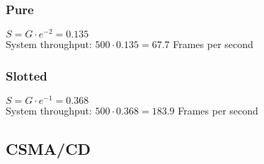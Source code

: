 \documentclass{article}
\begin{document}
\subsubsection*{Pure}
\(S = G \cdot e^{-2} = 0.135 \) \\
System throughput: \(500 \cdot 0.135 = 67.7\) Frames per second

\subsubsection*{Slotted}
\(S = G \cdot e^{-1} = 0.368 \) \\
System throughput: \(500 \cdot 0.368 = 183.9\) Frames per second

\subsection*{CSMA/CD}
\end{document}
